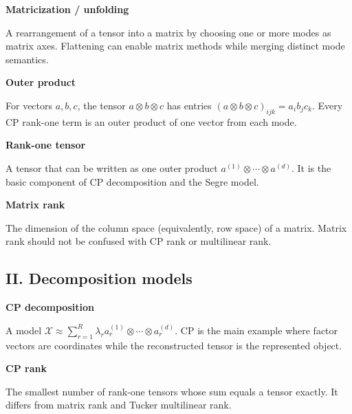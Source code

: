 \documentclass[10pt]{article}
\newenvironment{glossaryentry}[1]{%
  \par\medskip\noindent
  {\large\bfseries #1}\par\smallskip
}{\par\medskip}
\begin{document}
\begin{glossaryentry}{Matricization / unfolding}
A rearrangement of a tensor into a matrix by choosing one or more modes as matrix axes. Flattening can enable matrix methods while merging distinct mode semantics.
\par\smallskip{\small\color{muted}[KB09]}
\end{glossaryentry}


\begin{glossaryentry}{Outer product}
For vectors $a,b,c$, the tensor $a\otimes b\otimes c$ has entries $(a\otimes b\otimes c)_{ijk}=a_i b_j c_k$. Every CP rank-one term is an outer product of one vector from each mode.
\par\smallskip{\small\color{muted}[KB09]}
\end{glossaryentry}


\begin{glossaryentry}{Rank-one tensor}
A tensor that can be written as one outer product $a^{(1)}\otimes\cdots\otimes a^{(d)}$. It is the basic component of CP decomposition and the Segre model.
\par\smallskip{\small\color{muted}[KB09, BV18]}
\end{glossaryentry}


\begin{glossaryentry}{Matrix rank}
The dimension of the column space (equivalently, row space) of a matrix. Matrix rank should not be confused with CP rank or multilinear rank.

\end{glossaryentry}


\subsection{II. Decomposition models}

\begin{glossaryentry}{CP decomposition}
A model $\mathcal X\approx\sum_{r=1}^R\lambda_r a_r^{(1)}\otimes\cdots\otimes a_r^{(d)}$. CP is the main example where factor vectors are coordinates while the reconstructed tensor is the represented object.
\par\smallskip{\small\color{muted}[KB09, BV18]}
\end{glossaryentry}


\begin{glossaryentry}{CP rank}
The smallest number of rank-one tensors whose sum equals a tensor exactly. It differs from matrix rank and Tucker multilinear rank.
\par\smallskip{\small\color{muted}[KB09]}
\end{glossaryentry}
\end{document}
